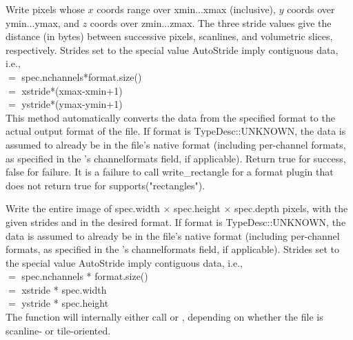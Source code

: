 Write pixels whose $x$ coords range over {\kw xmin}...{\kw xmax}
(inclusive), $y$ coords over {\kw ymin}...{\kw ymax}, and $z$ coords
over {\kw zmin}...{\kw zmax}.  The three stride values give the distance
(in bytes) between successive pixels, scanlines, and volumetric slices,
respectively.  Strides set to the special value {\kw AutoStride} imply
contiguous data, i.e.,\\
 $=$ {\kw spec.nchannels*format.size()} \\
 $=$ {\kw xstride*(xmax-xmin+1)} \\
 $=$ {\kw ystride*(ymax-ymin+1)}\\
This method automatically converts the data from the specified 
{\kw format} to the actual output format of the file.  
If {\cf format} is {\cf TypeDesc::UNKNOWN}, the data is assumed to
already be in the file's native format (including per-channel formats, 
as specified in the \ImageSpec's {\cf channelformats} field, if applicable).
Return {\kw true}
for success, {\kw false} for failure.  It is a failure to call 
{\kw write_rectangle} for a format plugin that does not return true for
{\kw supports("rectangles")}.

\apiend


Write the entire image of {\kw spec.width} $\times$ {\kw spec.height}
$\times$ {\kw spec.depth}
pixels, with the given strides and in the desired format.
If {\cf format} is {\cf TypeDesc::UNKNOWN}, the data is assumed to
already be in the file's native format (including per-channel formats, 
as specified in the \ImageSpec's {\cf channelformats} field, if applicable).
Strides set to the special value {\kw AutoStride} imply contiguous data,
i.e., \\
 $=$ {\kw spec.nchannels * format.size()} \\
 $=$ {\kw xstride * spec.width} \\
 $=$ {\kw ystride * spec.height}\\
The function will internally either call \writescanline or 
\writetile, depending on whether the file is scanline- or
tile-oriented.

